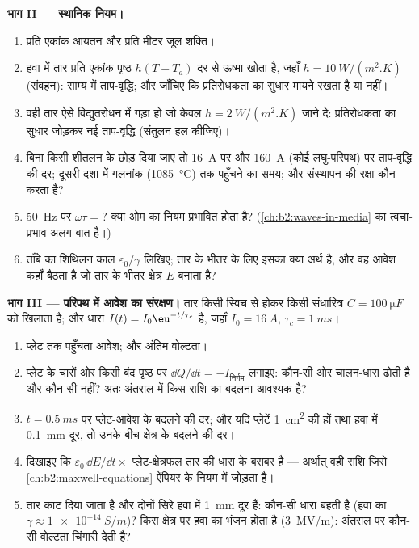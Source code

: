\begin{problem}[{सप्ताहांत समस्या --- घर के तार का एक मीटर, चार पैमानों पर
जाँचा गया: इलेक्ट्रॉन, स्थानिक नियम, परिपथ, और
विद्युत-लाइन}]
\medskip
\noindent\textbf{भाग II --- स्थानिक नियम।}
\begin{enumerate}[resume]
  \item प्रति एकांक आयतन और प्रति मीटर जूल शक्ति।
  \item हवा में तार प्रति एकांक पृष्ठ $h(T - T_a)$ दर से ऊष्मा खोता है,
        जहाँ $h = \qty{10}{W/(m^2.K)}$ (संवहन): साम्य में
        ताप-वृद्धि; और जाँचिए कि प्रतिरोधकता का सुधार
        मायने रखता है या नहीं।
  \item वही तार ऐसे विद्युतरोधन में गड़ा हो जो केवल $h =
        \qty{2}{W/(m^2.K)}$ जाने दे: प्रतिरोधकता का सुधार जोड़कर नई
        ताप-वृद्धि (संतुलन हल कीजिए)।
  \item बिना किसी शीतलन के छोड़ दिया जाए तो \qty{16}{A} पर और \qty{160}{A}
        (कोई लघु-परिपथ) पर ताप-वृद्धि की दर; दूसरी दशा में गलनांक
        (\qty{1085}{\degreeCelsius}) तक पहुँचने का समय; और संस्थापन की
        रक्षा कौन करता है?
  \item \qty{50}{Hz} पर $\omega\tau = ?$ क्या ओम का नियम प्रभावित होता है? (\cref{ch:b2:waves-in-media}
        का त्वचा-प्रभाव अलग बात है।)
  \item ताँबे का शिथिलन काल $\varepsilon_0/\gamma$ लिखिए; तार के भीतर  के
        लिए इसका क्या अर्थ है, और वह आवेश कहाँ बैठता है जो
        तार के भीतर क्षेत्र $E$ बनाता है?
\end{enumerate}

\medskip
\noindent\textbf{भाग III --- परिपथ में आवेश का संरक्षण।}
तार किसी स्विच से होकर किसी संधारित्र $C = \qty{100}{\micro F}$ को खिलाता है; और
धारा $I(t) = I_0\eu^{-t/\tau_c}$ है, जहाँ $I_0 = \qty{16}{A}$, $\tau_c = \qty{1}{ms}$।
\begin{enumerate}[resume]
  \item प्लेट तक पहुँचता आवेश; और अंतिम वोल्टता।
  \item प्लेट के चारों ओर किसी बंद पृष्ठ पर $\dd Q/\dd t = -I_{\text{निर्गम}}$
        लगाइए: कौन-सी ओर चालन-धारा ढोती है और कौन-सी नहीं?
        अतः अंतराल में किस राशि का बदलना आवश्यक है?
  \item $t = \qty{0.5}{ms}$ पर प्लेट-आवेश के बदलने की दर; और यदि
        प्लेटें \qty{1}{cm^2} की हों तथा हवा में \qty{0.1}{mm} दूर, तो उनके बीच क्षेत्र के
        बदलने की दर।
  \item दिखाइए कि $\varepsilon_0\,\dd E/\dd t \times$ प्लेट-क्षेत्रफल तार की धारा के
        बराबर है --- अर्थात् वही राशि जिसे \cref{ch:b2:maxwell-equations}
        ऐंपियर के नियम में जोड़ता है।
  \item तार काट दिया जाता है और दोनों सिरे हवा में \qty{1}{mm} दूर हैं:
        कौन-सी धारा बहती है (हवा का $\gamma \approx \qty{1e-14}{S/m}$)? किस
        क्षेत्र पर हवा का भंजन होता है (\qty{3}{MV/m}): अंतराल पर कौन-सी वोल्टता
        चिंगारी देती है?
\end{enumerate}


\end{problem}
